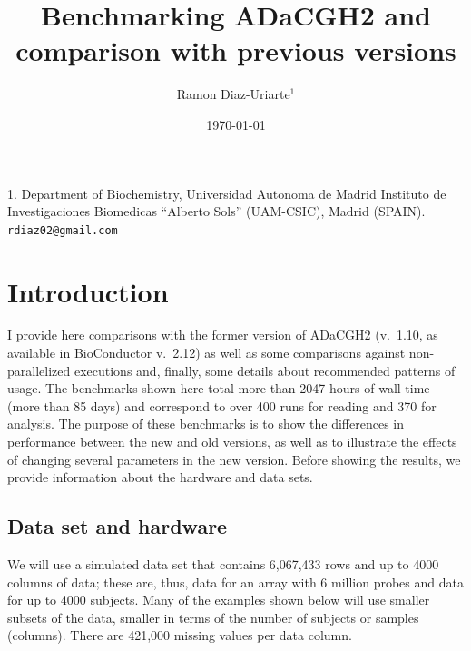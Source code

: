 \documentclass[a4paper,11pt]{article}
\title{Benchmarking ADaCGH2 and comparison with previous versions}
\date{\mydate\today}
\author{Ramon Diaz-Uriarte$^{1}$}
\begin{document}
\maketitle

\begin{center}
1. Department of Biochemistry,
Universidad Autonoma de Madrid
Instituto de Investigaciones Biomedicas ``Alberto Sols'' (UAM-CSIC), Madrid
(SPAIN).
{\tt rdiaz02@gmail.com}
\end{center}

\tableofcontents
\listoftables
\listoffigures


\clearpage

\section{Introduction}
I provide here comparisons with the former version of ADaCGH2 (v.\ 1.10,
as available in BioConductor v.\ 2.12) as well as some comparisons against
non-parallelized executions and, finally, some details about recommended
patterns of usage. The benchmarks shown here total more than 2047 hours of
wall time (more than 85 days) and correspond to over 400 runs for reading
and 370 for analysis. The purpose of these benchmarks is to show the
differences in performance between the new and old versions, as well as to
illustrate the effects of changing several parameters in the new
version. Before showing the results, we provide information about the
hardware and data sets.




\subsection{Data set and hardware}
\label{sec:data-set-hardware}

We will use a simulated data set that contains 6,067,433 rows and up to
4000 columns of data; these are, thus, data for an array with 6 million
probes and data for up to 4000 subjects. Many of the examples shown below
will use smaller subsets of the data, smaller in terms of the number of
subjects or samples (columns). There are 421,000 missing values per data
column. 
\end{document}
